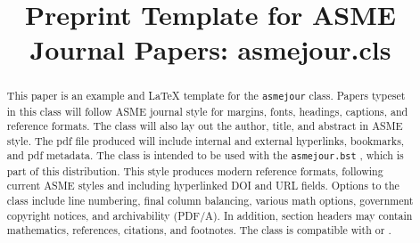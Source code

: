 \documentclass[subscriptcorrection,upint,varvw,barcolor=Goldenrod3,mathalfa=cal=euler,balance,hyphenate,french,pdf-a]{asmejour} %
\begin{document}




\title{Preprint Template for ASME\\ Journal Papers:  asmejour.cls}



   
\begin{abstract}
This paper is an example and {\upshape\LaTeX} template for the {\upshape\texttt{asmejour}} class. Papers typeset in this class will follow ASME journal style for margins, fonts, headings, captions, and reference formats. The class will also lay out the author, title, and abstract in ASME style. The pdf file produced will include internal and external hyperlinks, bookmarks, and pdf metadata. The class is intended to be used with the {\upshape\texttt{asmejour.bst} }, which is part of this distribution. This style produces modern reference formats, following current ASME styles and including hyperlinked DOI and URL fields. Options to the class include line numbering, final column balancing, various math options, government copyright notices, and archivability (PDF/A). In addition, section headers may contain mathematics, references, citations, and footnotes. The class is compatible with {\upshape{}} or {\upshape{}}.
\end{abstract}
\end{document}
